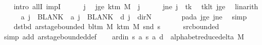 \begin{isabellebody}
\ \ \isamarkupfalse%
\ {\isacharparenleft}{\kern0pt}intro\ allI\ impI{\isacharparenright}{\kern0pt}\isanewline
\ \ \ \ \isamarkupfalse%
\ j\ \isamarkupfalse%
\ jge{\isacharcolon}{\kern0pt}\ {\isachardoublequoteopen}k{\isacharunderscore}{\kern0pt}tm\ M\ {\isasymle}\ j{\isachardoublequoteclose}\isanewline
\ \ \ \ \isamarkupfalse%
\ jne{\isacharcolon}{\kern0pt}\ {\isachardoublequoteopen}j\ {\isasymnoteq}\ tk{\isachardoublequoteclose}\ \isamarkupfalse%
\ tk{\isacharunderscore}{\kern0pt}lt\ jge\ \isamarkupfalse%
\ linarith\isanewline
\ \ \ \ \isamarkupfalse%
\ {\isachardoublequoteopen}{\isacharquery}{\kern0pt}a\ j\ {\isacharequal}{\kern0pt}\ BLANK{}\ {\isasymand}\ {\isacharquery}{\kern0pt}a\ j\ {\isacharequal}{\kern0pt}\ BLANK{}\ {\isasymand}\ {\isacharquery}{\kern0pt}d\ j\ {\isacharequal}{\kern0pt}\ dir{\isachardot}{\kern0pt}N{\isachardoublequoteclose}\isanewline
\ \ \ \ \ \ \isamarkupfalse%
\ pad{\isacharunderscore}{\kern0pt}a\ jge\ jne\ \isamarkupfalse%
\ simp\isanewline
\ \ \isamarkupfalse%
\isanewline
\ \ \isamarkupfalse%
\ dst{\isacharunderscore}{\kern0pt}bd{\isacharcolon}{\kern0pt}\ {\isachardoublequoteopen}ar{\isacharunderscore}{\kern0pt}stage{\isacharunderscore}{\kern0pt}bounded\ {\isacharparenleft}{\kern0pt}bl{\isacharunderscore}{\kern0pt}tm\ M{\isacharparenright}{\kern0pt}\ {\isacharparenleft}{\kern0pt}k{\isacharunderscore}{\kern0pt}tm\ M{\isacharparenright}{\kern0pt}\ {\isacharparenleft}{\kern0pt}snd\ {\isacharquery}{\kern0pt}s{\isacharprime}{\kern0pt}{\isacharparenright}{\kern0pt}{\isachardoublequoteclose}\isanewline
\ \ \ \ \isamarkupfalse%
\ src{\isacharunderscore}{\kern0pt}bounded\ \isamarkupfalse%
\ {\isacharparenleft}{\kern0pt}simp\ add{\isacharcolon}{\kern0pt}\ ar{\isacharunderscore}{\kern0pt}stage{\isacharunderscore}{\kern0pt}bounded{\isacharunderscore}{\kern0pt}def{\isacharparenright}{\kern0pt}\isanewline
\ \ \isamarkupfalse%
\ ard{\isacharunderscore}{\kern0pt}in{\isacharcolon}{\kern0pt}\ {\isachardoublequoteopen}{\isacharparenleft}{\kern0pt}{\isacharquery}{\kern0pt}s{\isacharcomma}{\kern0pt}\ {\isacharquery}{\kern0pt}a{\isacharcomma}{\kern0pt}\ {\isacharquery}{\kern0pt}s{\isacharprime}{\kern0pt}{\isacharcomma}{\kern0pt}\ {\isacharquery}{\kern0pt}a{\isacharcomma}{\kern0pt}\ {\isacharquery}{\kern0pt}d{\isacharparenright}{\kern0pt}\ {\isasymin}\ alphabet{\isacharunderscore}{\kern0pt}reduce{\isacharunderscore}{\kern0pt}delta\ M{\isachardoublequoteclose}\isanewline

\end{isabellebody}
